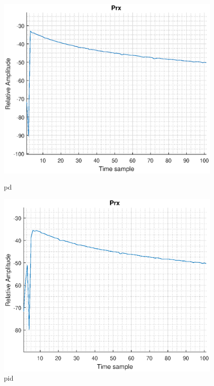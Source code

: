 \begin{figure}[H]
\vspace*{0.5cm} %
\begin{minipage}[t]{0.45\textwidth}
\includegraphics[width=\linewidth]{figures/s1_pd_prx.eps}
\caption{pd}
\label{fig:s1_pd_prx}
\end{minipage}
\hspace{\fill}
\begin{minipage}[t]{0.45\textwidth}
\includegraphics[width=\linewidth]{figures/s1_pid_prx.eps}
\caption{pid}
\label{fig:s1_pid_prx}
\end{minipage}

\end{figure}

